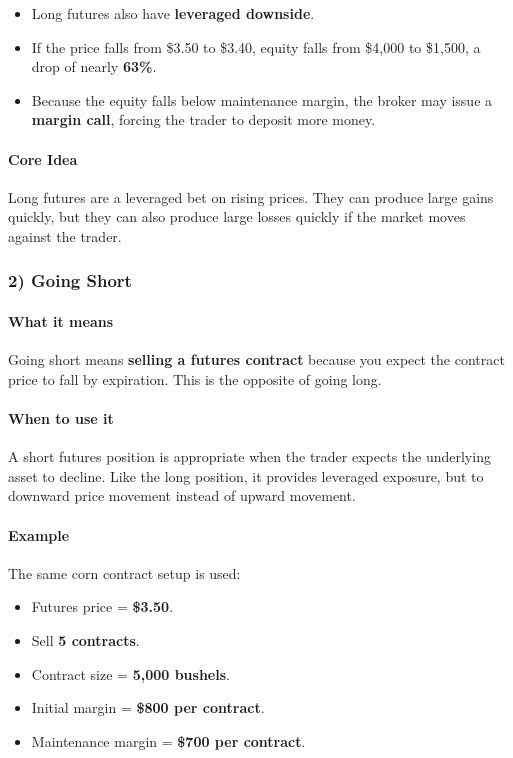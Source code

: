 \documentclass[12pt,openany]{book}
\begin{document}
\begin{itemize}[leftmargin=*]
    \item Long futures also have \textbf{leveraged downside}.
    \item If the price falls from \$3.50 to \$3.40, equity falls from \$4,000 to \$1,500, a drop of nearly \textbf{63\%}.
    \item Because the equity falls below maintenance margin, the broker may issue a \textbf{margin call}, forcing the trader to deposit more money.
\end{itemize}

\paragraph{Core Idea}

Long futures are a leveraged bet on rising prices. They can produce large gains quickly, but they can also produce large losses quickly if the market moves against the trader.

\subsubsection{2) Going Short}

\paragraph{What it means}

Going short means \textbf{selling a futures contract} because you expect the contract price to fall by expiration. This is the opposite of going long.

\paragraph{When to use it}

A short futures position is appropriate when the trader expects the underlying asset to decline. Like the long position, it provides leveraged exposure, but to downward price movement instead of upward movement.

\paragraph{Example}

The same corn contract setup is used:

\begin{itemize}[leftmargin=*]
    \item Futures price = \textbf{\$3.50}.
    \item Sell \textbf{5 contracts}.
    \item Contract size = \textbf{5,000 bushels}.
    \item Initial margin = \textbf{\$800 per contract}.
    \item Maintenance margin = \textbf{\$700 per contract}.
\end{itemize}
\end{document}
